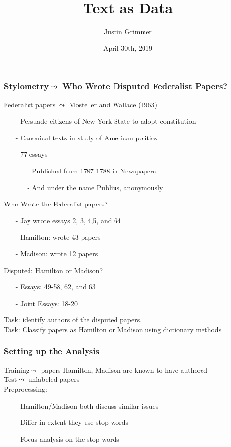 \documentclass{beamer}
\title[Text as Data] %
{Text as Data}
\author{Justin Grimmer}
\institute[Stanford University]{Professor\\Department of Political Science \\  Stanford University}
\date{April 30th, 2019}%
\numberwithin{equation}{section}
\begin{document}
\begin{frame}
\titlepage
\end{frame}





\begin{frame}
\frametitle{Stylometry$\leadsto$ Who Wrote Disputed Federalist Papers?}


Federalist papers $\leadsto$ Mosteller and Wallace (1963)
\begin{itemize}
\item[-] Persuade citizens of New York State to adopt constitution
\item[-] Canonical texts in study of American politics
\item[-] 77 essays
\begin{itemize}
\item[-] Published from 1787-1788 in Newspapers
\item[-] And under the name \alert{Publius}, anonymously
\end{itemize}
\end{itemize}
\alert{Who Wrote the Federalist papers}?
\begin{itemize}
\item[-] Jay wrote essays 2, 3, 4,5, and 64
\item[-] Hamilton: wrote 43 papers
\item[-] Madison: wrote 12 papers
\end{itemize}
\alert{Disputed:} Hamilton or Madison?
\begin{itemize}
\item[-] Essays: 49-58, 62, and 63
\item[-] Joint Essays: 18-20
\end{itemize}
\alert{Task}: identify authors of the disputed papers.  \\
\alert{Task}: Classify papers as Hamilton or Madison using dictionary methods

\end{frame}


\begin{frame}
\frametitle{Setting up the Analysis}


\alert{Training}$\leadsto$ papers Hamilton, Madison are known to have authored\\
\alert{Test}$\leadsto$ unlabeled papers\\
\alert{Preprocessing}:
\begin{itemize}
\item[-] Hamilton/Madison both discuss similar issues
\item[-] Differ in extent they use \alert{stop words}
\item[-] Focus analysis on the stop words
\end{itemize}


\end{frame}
\end{document}
